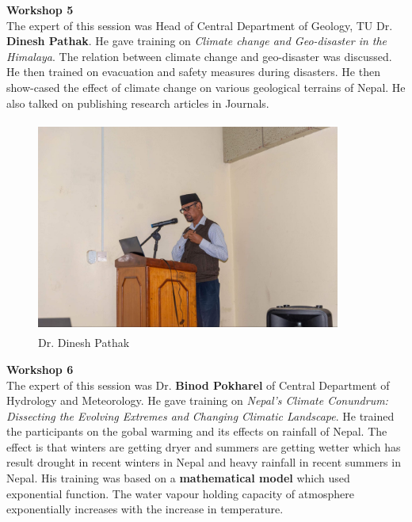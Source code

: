 \documentclass[a4paper,12pt]{report}
\begin{document}
\vspace{2cm}

{\bfseries \large Workshop 5}\\[3mm]
The expert of this session was Head of Central Department of Geology, TU Dr. \textbf{Dinesh Pathak}. He gave training on \textit{Climate change and Geo-disaster in the Himalaya}. The relation between climate change and geo-disaster was discussed. He then trained on evacuation and safety measures during disasters. He then show-cased the effect of climate change on various geological terrains of Nepal. He also talked on publishing research articles in Journals.

\vspace{4mm}
\begin{figure}[h!]
  \centering
  \includegraphics[width=10cm, height=7cm]{pathak.jpeg}
  \caption{Dr. Dinesh Pathak}
\end{figure}
\clearpage

{\bfseries \large Workshop 6}\\[3mm]
The expert of this session was Dr. \textbf{Binod Pokharel} of Central Department of Hydrology and Meteorology. He gave training on \textit{Nepal's Climate Conundrum: Dissecting the Evolving Extremes and Changing Climatic Landscape}. He trained the participants on the gobal warming and its effects on rainfall of Nepal. The effect is that winters are getting dryer and summers are getting wetter which has result drought in recent winters in Nepal and heavy rainfall in recent summers in Nepal. His training was based on a \textbf{mathematical model} which used exponential function. The water vapour holding capacity of atmosphere exponentially increases with the increase in temperature.
\vspace{5mm}
\end{document}
